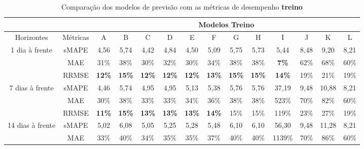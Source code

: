 \begin{landscape}
	
	\begin{table}[H]
	\centering
	\caption{Comparação dos modelos de previsão com as métricas de desempenho \textbf{treino}}\label{tb:apd-trn}
	\begin{tabular}{@{}cccccccccccccc@{}}
		\toprule
		\textbf{}                         &          & \multicolumn{12}{c}{Modelos Treino}                                                                                                                                 \\ \midrule
		Horizontes                        & Métricas & A             & B             & C             & D             & E             & F             & G             & H             & I             & J    & K     & L    \\ \midrule
		\multirow{3}{*}{1 dia à frente}   & sMAPE    & 4,56          & 5,74          & 4,42          & 4,84          & 4,50          & 5,09          & 5,75          & 5,73          & 5,44          & 8,48 & 9,20  & 8,21 \\
		& MAE      & 31\%          & 38\%          & 30\%          & 32\%          & 30\%          & 34\%          & 38\%          & 38\%          & \textbf{7\%}  & 62\% & 68\%  & 60\% \\
		& RRMSE    & \textbf{12\%} & \textbf{15\%} & \textbf{12\%} & \textbf{12\%} & \textbf{12\%} & \textbf{13\%} & \textbf{15\%} & \textbf{15\%} & \textbf{14\%} & 19\% & 21\%  & 19\% \\ \midrule
		\multirow{3}{*}{7 dias à frente}  & sMAPE    & 4,46          & 5,74          & 4,95          & 4,95          & 5,13          & 5,38          & 5,76          & 5,76          & 37,19         & 9,48 & 10,88 & 8,21 \\
		& MAE      & 30\%          & 38\%          & 33\%          & 33\%          & 34\%          & 36\%          & 38\%          & 38\%          & 523\%         & 70\% & 82\%  & 60\% \\
		& RRMSE    & \textbf{11\%} & \textbf{15\%} & \textbf{13\%} & \textbf{13\%} & \textbf{13\%} & \textbf{14\%} & 15\%          & 15\%          & 119\%         & 23\% & 27\%  & 19\% \\ \midrule
		\multirow{3}{*}{14 dias à frente} & sMAPE    & 5,02          & 6,08          & 5,05          & 5,25          & 5,28          & 5,48          & 6,10          & 6,10          & 56,30         & 9,48 & 11,28 & 8,21 \\
		& MAE      & 33\%          & 40\%          & 34\%          & 35\%          & 35\%          & 37\%          & 40\%          & 40\%          & 1139\%        & 70\% & 86\%  & 60\% \\

\end{tabular}
\end{table}
\end{landscape}

